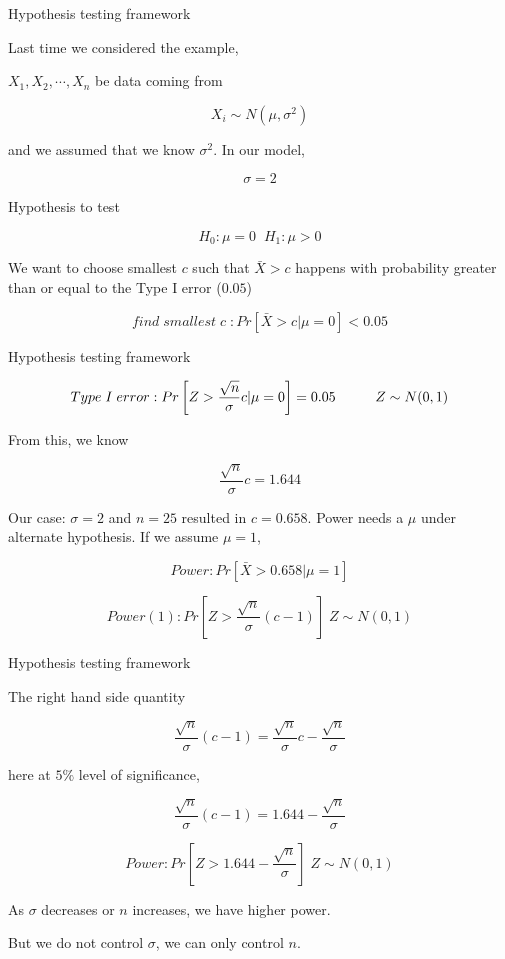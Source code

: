 \documentclass{beamer}\usepackage[]{graphicx}\usepackage[]{color}
\begin{document}
\begin{frame}{Hypothesis testing framework}

Last time we considered the example, 

$X_1, X_2, \cdots, X_{n}$ be data coming from 

$$ X_{i} \sim N(\mu, \sigma^2) $$ 

and we assumed that we know $\sigma^2$. In our model, 

$$ \sigma = 2 $$ 

Hypothesis to test 

$$ H_0: \mu=0 \;\; H_1: \mu > 0 $$ 

We want to choose smallest $c$ such that $\bar{X} > c$ happens with probability  greater than or equal to the Type I error ($0.05$)

$$ find \; smallest \; c\; : Pr \left [ \bar{X} > c | \mu=0 \right] < 0.05 $$

\end{frame}

\begin{frame}{Hypothesis testing framework}

$$ Type \; I \; error: Pr \left [ Z > \frac{\sqrt{n}}{\sigma}c | \mu=0 \right ] = 0.05  \hspace{1 cm} Z \sim N(0,1) $$ 

From this, we know 

$$ \frac{\sqrt{n}}{\sigma}c = 1.644  $$ 

Our case: $\sigma=2$ and $n=25$ resulted in $c=0.658$. 
Power needs a $\mu$ under alternate hypothesis. If we assume $\mu=1$,

$$ Power: Pr \left [ \bar{X} > 0.658 | \mu=1 \right] $$

$$ Power(1):  Pr \left [ Z > \frac{\sqrt{n}}{\sigma}(c-1)  \right] \; Z \sim N(0,1) $$

\end{frame}

\begin{frame}{Hypothesis testing framework}

The right hand side quantity 

$$ \frac{\sqrt{n}}{\sigma}(c-1) = \frac{\sqrt{n}}{\sigma}c - \frac{\sqrt{n}}{\sigma} $$ \pause

here at $5\%$ level of significance,

$$ \frac{\sqrt{n}}{\sigma}(c-1) = 1.644 - \frac{\sqrt{n}}{\sigma} $$

$$ Power:  Pr \left [ Z > 1.644 - \frac{\sqrt{n}}{\sigma}  \right] \; Z \sim N(0,1) $$ \pause

As $\sigma$ decreases or $n$ increases, we have higher power. \pause 

But we do not control $\sigma$, we can only control $n$. \pause

\end{frame}
\end{document}
